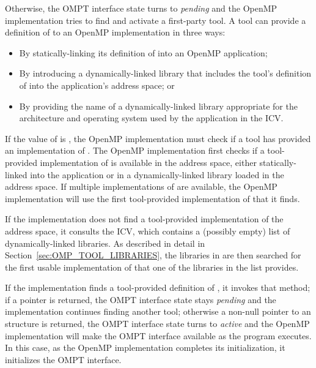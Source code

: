 Otherwise, the OMPT interface state turns to \emph{pending} and the OpenMP 
implementation tries to find and activate a first-party tool.
A tool can provide a definition of  to an OpenMP 
implementation in three ways:

\begin{itemize}
\item By statically-linking its definition of  into an
      OpenMP application;
\item By introducing a dynamically-linked library that includes the tool's 
      definition of  into the application's address space; or
\item By providing the name of a dynamically-linked library appropriate for 
      the architecture and operating system used by the application in the
        ICV.
\end{itemize}

If the value of  is , the OpenMP implementation must 
check if a tool has provided an implementation of .  The 
OpenMP implementation first checks if a tool-provided implementation of 
 is available in the address space, either statically-linked 
into the application or in a dynamically-linked library loaded in the address
space. If multiple implementations of  are available,
the OpenMP implementation will use the first tool-provided implementation of 
 that it finds.

If the implementation does not find a tool-provided implementation of 
 the address space, it consults the  
ICV, which contains a (possibly empty) list of dynamically-linked libraries. As 
described in detail in Section~\ref{sec:OMP_TOOL_LIBRARIES}, the libraries in
 are then searched for the first usable implementation 
of  that one of the libraries in the list provides.

If the implementation finds a tool-provided definition of ,
it invokes that method; if a  pointer is returned, the OMPT interface 
state stays \emph{pending} and the implementation continues finding another tool; 
otherwise a non-null pointer to an  
structure is returned, the OMPT interface state turns to \emph{active} and the 
OpenMP implementation will make the OMPT interface available as the program 
executes.
In this case, as the OpenMP implementation completes its initialization, it 
initializes the OMPT interface.

